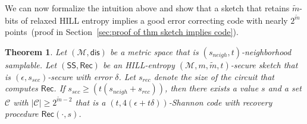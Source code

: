 \documentclass[11pt]{article}
\newcommand{\secref}[1]{\mbox{Section~\ref{#1}}}
\newcommand{\thref}[1]{\mbox{Theorem~\ref{#1}}}
\newcommand{\class}[1]{{\ensuremath{\mathsf{#1}}}}
\newcommand{\sketch}{\ensuremath{\class{SS}}\xspace}
\newcommand{\rec}{\ensuremath{\class{Rec}}\xspace}
\newcommand{\sample}{\ensuremath{\class{Sample}}\xspace}
\newcommand{\dis}{\ensuremath{\mathsf{dis}}}
\newcommand{\ngl}{\ensuremath{\mathtt{ngl}}\xspace}
\newcommand{\Hoo}{\mathrm{H}_\infty}
\newtheorem{theorem}{Theorem}[section]
\newcommand{\authnote}[2]{{\textcolor{red}{\textsf{#1 notes: }\textcolor{blue}{ #2}}\marginpar{\textcolor{red}{\textbf{!!!!!}}}}}
\newcommand{\authnote}[2]{}
\newcommand{\bnote}[1]{{\authnote{Ben}{#1}}}
\begin{document}
We can now formalize the intuition above and show that a sketch that retains $\tilde{m}$-bits of relaxed HILL entropy implies a good error correcting code with nearly $2^{\tilde{m}}$ points~(proof in \secref{sec:proof of thm sketch implies code}).
\begin{theorem}\label{thm:impSketchArbitraryW}
Let $(\mathcal{M}, \dis)$ be a metric space that is $(s_{neigh}, t)$-neighborhood samplable.  Let $(\sketch, \rec)$ be an HILL-entropy $(\mathcal{M}, m, \tilde{m}, t)$-secure sketch that is $(\epsilon, s_{sec})$-secure with error $\delta$.  Let $s_{rec}$ denote the size of the circuit that computes $\rec$.  If $s_{sec}\geq (t(s_{neigh}+s_{rec}))$,  then there exists a value $s$ and a set $\mathcal{C}$ with $|\mathcal{C}|\geq 2^{\tilde{m}-2}$  that is a $(t, 4(\epsilon+t\delta))$-Shannon code with recovery procedure $\rec(\cdot, s)$.
\end{theorem}
\end{document}
